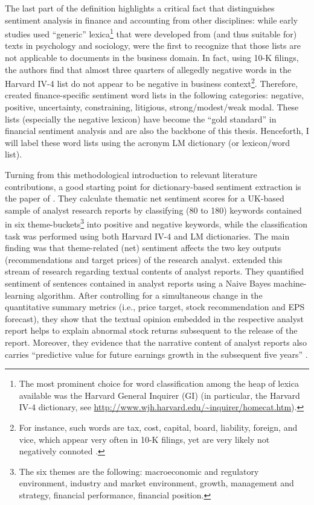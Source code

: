 The last part of the definition highlights a critical fact that distinguishes sentiment analysis in finance and accounting from other disciplines: while early studies used \enquote{generic} lexica\footnote{The most prominent choice for word classification among the heap of lexica available was the Harvard General Inquirer (GI) (in particular, the Harvard IV-4 dictionary, see \url{http://www.wjh.harvard.edu/~inquirer/homecat.htm}).} that were developed from (and thus suitable for) texts in psychology and sociology, \textcite{Loughran2011} were the first to recognize that those lists are not applicable to documents in the business domain. In fact, using 10-K filings, the authors find that almost three quarters of allegedly negative words in the Harvard IV-4 list do not appear to be negative in business context\footnote{For instance, such words are \textsf{tax, cost, capital, board, liability, foreign}, and \textsf{vice}, which appear very often in 10-K filings, yet are very likely not negatively connoted \parencite[36]{Loughran2011}.}. Therefore, \textcite{Loughran2011} created finance-specific sentiment word lists in the following categories: negative, positive, uncertainty, constraining, litigious, strong/modest/weak modal. These lists (especially the negative lexicon) have become the \enquote{gold standard} in financial sentiment analysis and are also the backbone of this thesis. Henceforth, I will label these word lists using the acronym LM dictionary (or lexicon/word list). 


Turning from this methodological introduction to relevant literature contributions, a good starting point for dictionary-based sentiment extraction is the paper of \textcite{YukselturkTucker2015}. They calculate thematic net sentiment scores for a UK-based sample of analyst research reports by classifying (80 to 180) keywords contained in six theme-buckets\footnote{The six themes are the following: macroeconomic and regulatory environment, industry and market environment, growth, management and strategy, financial performance, financial position.} into positive and negative keywords, while the classification task was performed using both Harvard IV-4 and LM dictionaries. The main finding was that theme-related (net) sentiment affects the two key outputs (recommendations and target prices) of the research analyst. \textcite{HuangZangZheng14} extended this stream of research regarding textual contents of analyst reports. They quantified sentiment of sentences contained in analyst reports using a Naive Bayes machine-learning algorithm. After controlling for a simultaneous change in the quantitative summary metrics (i.e., price target, stock recommendation and EPS forecast), they show that the textual opinion embedded in the respective analyst report helps to explain abnormal stock returns subsequent to the release of the report. Moreover, they evidence that the narrative content of analyst reports also carries \enquote {predictive value for future earnings growth in the subsequent five years} \parencite[2151]{HuangZangZheng14}. 

